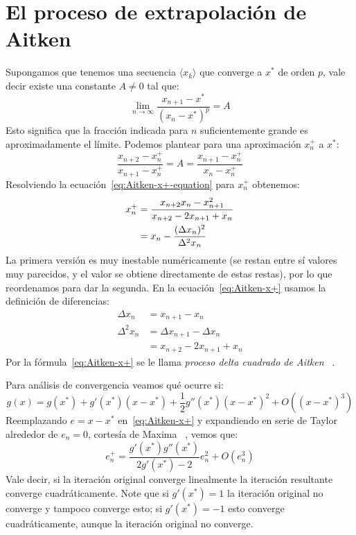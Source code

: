 \section{El proceso de extrapolación de Aitken}
\label{sec:Aitken}

  Supongamos que tenemos una secuencia \(\langle x_k \rangle\)
  que converge a \(x^*\) de orden \(p\),
  vale decir existe una constante \(A \ne 0\) tal que:
  \begin{equation}
    \label{eq:linear-limit}
    \lim_{n \to \infty} \frac{x_{n + 1} - x^*}{(x_n - x^*)^p}
      = A
  \end{equation}
  Esto significa que la fracción indicada
  para \(n\) suficientemente grande es aproximadamente el límite.
  Podemos plantear para una aproximación \(x_n^+\) a \(x^*\):
  \begin{equation}
    \label{eq:Aitken-x+-equation}
    \frac{x_{n + 2} - x_n^+}{x_{n + 1} - x_n^+}
      = A
      = \frac{x_{n + 1} - x_n^+}{x_n - x_n^+}
  \end{equation}
  Resolviendo la ecuación~\eqref{eq:Aitken-x+-equation}
  para \(x_n^+\) obtenemos:
  \begin{align}
    x_n^+
      &= \frac{x_{n + 2} x_n - x_{n + 1}^2}{x_{n + 2} - 2 x_{n + 1} + x_n}
            \notag \\
      &= x_n - \frac{(\Delta x_n)^2}{\Delta^2 x_n}
            \label{eq:Aitken-x+}
  \end{align}
  La primera versión es muy inestable numéricamente
  (se restan entre sí valores muy parecidos,
   y el valor se obtiene directamente de estas restas),
  por lo que reordenamos para dar la segunda.
  En la ecuación~\eqref{eq:Aitken-x+} usamos la definición de diferencias:
  \begin{align*}
    \Delta x_n
      &= x_{n + 1} - x_n \\
    \Delta^2 x_n
      &= \Delta x_{n + 1} - \Delta x_n \\
      &= x_{n + 2} - 2 x_{n + 1} + x_n
  \end{align*}
  Por la fórmula~\eqref{eq:Aitken-x+}
  se le llama \emph{proceso delta cuadrado de Aitken}~%
    \cite{aitken27:_delta_squared}.

  Para análisis de convergencia
  veamos qué ocurre si:
  \begin{equation*}
    g(x)
      = g(x^*)
         + g'(x^*) (x - x^*)
         + \frac{1}{2} g''(x^*) (x - x^*)^2 + O((x - x^*)^3)
  \end{equation*}
  Reemplazando \(e = x - x^*\) en~\eqref{eq:Aitken-x+}
  y expandiendo en serie de Taylor alrededor de \(e_n = 0\),
  cortesía de Maxima~%
    \cite{maxima20:_5.44.0},
  vemos que:
  \begin{equation*}
    e_n^+
      = \frac{g'(x^*) g''(x^*)}{2 g'(x^*) - 2} e_n^2 + O(e_n^3)
  \end{equation*}
  Vale decir,
  si la iteración original converge linealmente
  la iteración resultante converge cuadráticamente.
  Note que si \(g'(x^*) = 1\) la iteración original no converge
  y tampoco converge esto;
  si \(g'(x^*) = -1\) esto converge cuadráticamente,
  aunque la iteración original no converge.

